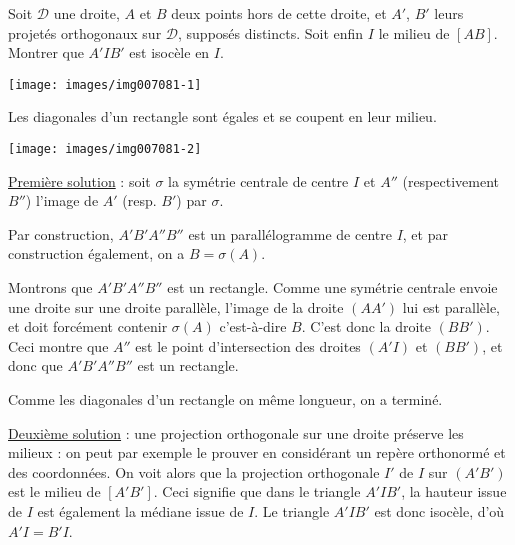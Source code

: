 \begin{exo}
Soit $\mathcal D$ une droite, $A$ et $B$ deux points hors de cette droite, et $A'$, $B'$ leurs projetés orthogonaux sur $\mathcal D$, supposés distincts. Soit enfin $I$ le milieu de $[AB]$. Montrer que $A'IB'$ est isocèle en $I$.
\begin{center}
\texttt{[image: images/img007081-1]}
\end{center}
\begin{hint} %
Les diagonales d'un rectangle sont égales et se coupent en leur milieu. %
\end{hint}
\begin{sol}
\begin{center}
\texttt{[image: images/img007081-2]}
\end{center}
\underline{Première solution} : soit $\sigma$ la symétrie centrale de centre $I$ et  $A''$ (respectivement $B''$) l'image de $A'$ (resp. $B'$) par $\sigma$. 

Par construction, $A'B'A''B''$ est un parallélogramme de centre $I$, et par construction également, on a $B=\sigma(A)$.

Montrons que $A'B'A''B''$ est un rectangle. Comme une symétrie centrale envoie une droite sur une droite parallèle, l'image de la droite $(AA')$ lui est parallèle, et doit forcément contenir $\sigma(A)$ c'est-à-dire $B$. C'est donc la droite $(BB')$. Ceci montre que $A''$ est le point d'intersection des droites $(A'I)$ et $(BB')$, et donc que $A'B'A''B''$ est un rectangle.

Comme les diagonales d'un rectangle on même longueur, on a terminé.

\underline{Deuxième solution} : une projection orthogonale sur une droite préserve les milieux : on peut par exemple le prouver en considérant un repère orthonormé et des coordonnées. On voit alors que la  projection orthogonale $I'$ de $I$ sur $(A'B')$ est le milieu de $[A'B']$. Ceci signifie que dans le triangle $A'IB'$, la hauteur issue de $I$ est également la médiane issue de $I$. Le triangle $A'IB'$ est donc isocèle, d'où $A'I = B'I$.
\end{sol}
\end{exo}

